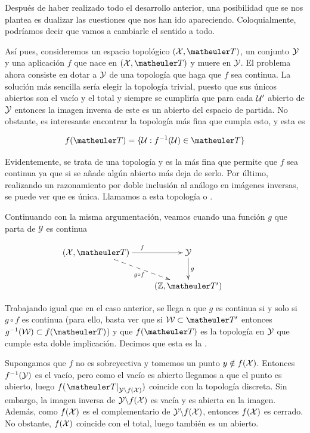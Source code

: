 Después de haber realizado todo el desarrollo anterior, una posibilidad que se nos plantea es dualizar las cuestiones que nos han ido apareciendo. Coloquialmente, podríamos decir que vamos a cambiarle el sentido a todo.

Así pues, consideremos un espacio topológico $(\mathcal{\X},\T)$, un conjunto $\mathcal{\mathcal{Y}}$ y una aplicación $f$ que nace en $(\mathcal{\X},\T)$ y muere en $\mathcal{\mathcal{Y}}$. El problema ahora consiste en dotar a $\mathcal{\mathcal{Y}}$ de una topología que haga que $f$ sea continua. La solución más sencilla sería elegir la topología trivial, puesto que sus únicos abiertos son el vacío y el total y siempre se cumpliría que para cada $\mathcal{U}'$ abierto de $\mathcal{\mathcal{Y}}$ entonces la imagen inversa de este es un abierto del espacio de partida. No obstante, es interesante encontrar la topología más fina que cumpla esto, y esta es 

\[f(\T)=\{\U: f^{-1}(\U)\in \T\}\]

Evidentemente, se trata de una topología y es la más fina que permite que $f$ sea continua ya que si se añade algún abierto más deja de serlo. Por último, realizando un razonamiento por doble inclusión al análogo en imágenes inversas, se puede ver que es única. Llamamos a esta topología  o .

Continuando con la misma argumentación, veamos cuando una función $g$ que parta de $\mathcal{Y}$ es continua

\begin{equation}
\label{cont_propiedad_universal_top_imagen}
\xymatrix{
	(\mathcal{\X},\T) \ar[r]^f \ar@{-->}[rd]_{g\circ f} &
	\mathcal{\Y} \ar[d]^g & \\
	&(\mathcal{\Z},\T')}
\end{equation}

Trabajando igual que en el caso anterior, se llega a que $g$ es continua si y solo si $g\circ f$ es continua (para ello, basta ver que si $\W\subset \T'$ entonces $g^{-1}(\W)\subset f(\T)$) y que $f(\T)$ es la topología en $\mathcal{\mathcal{Y}}$ que cumple esta doble implicación. Decimos que esta es la .

\begin{obs}[Sobreyectividad]
	
	Supongamos que $f$ no es sobreyectiva y tomemos un punto $y\notin f(\mathcal{\mathcal{X}})$. Entonces $f^{-1}(\mathcal{\mathcal{Y}})$ es el vacío, pero como el vacío es abierto llegamos a que el punto es abierto, luego $f(\left.\T\right|_{\mathcal{\Y}\backslash f(\mathcal{\X})})$ coincide con la topología discreta. Sin embargo, la imagen inversa de $\mathcal{\mathcal{Y}}\backslash f(\mathcal{\mathcal{X}})$ es vacía y es abierta en la imagen. Además, como $f(\mathcal{\mathcal{X}})$ es el complementario de $\mathcal{\mathcal{Y}}\backslash f(\mathcal{\mathcal{X}})$, entonces $f(\mathcal{\mathcal{X}})$ es cerrado. No obstante, $f(\mathcal{\mathcal{X}})$ coincide con el total, luego también es un abierto. 	
\end{obs}

